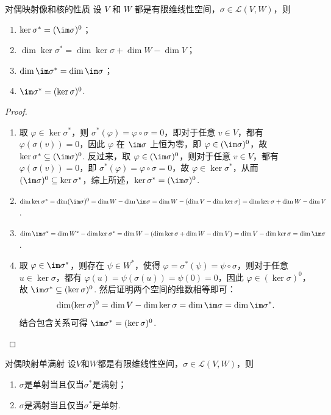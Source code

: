 \begin{theorem}{}{对偶映射像和核的性质}
    设 $V$ 和 $W$ 都是有限维线性空间，$\sigma\in\mathcal{L}(V,W)$，则
    \begin{enumerate}
        \item \label{item:6:对偶映射像和核的性质1} $\ker\sigma^*=(\im\sigma)^0$；
        \item $\dim\ker\sigma^*=\dim\ker\sigma+\dim W-\dim V$；
        \item $\dim\im\sigma^*=\dim\im\sigma$；
        \item \label{item:6:对偶映射像和核的性质4} $\im\sigma^*=(\ker\sigma)^0$.
    \end{enumerate}
\end{theorem}

\begin{proof}
    \begin{enumerate}
        \item 取 $\varphi \in \ker \sigma^*$，则 $\sigma^*(\varphi) = \varphi \circ \sigma = 0$，即对于任意 $v \in V$，都有 $\varphi(\sigma(v)) = 0$，因此 $\varphi$ 在 $\im \sigma$ 上恒为零，即 $\varphi \in (\im \sigma)^0$，故 $\ker \sigma^* \subseteq (\im \sigma)^0$. 反过来，取 $\varphi \in (\im \sigma)^0$，则对于任意 $v \in V$，都有 $\varphi(\sigma(v)) = 0$，即 $\sigma^*(\varphi) = \varphi \circ \sigma = 0$，故 $\varphi \in \ker \sigma^*$，从而 $(\im \sigma)^0 \subseteq \ker \sigma^*$，综上所述，$\ker \sigma^* = (\im \sigma)^0$.
        \item $\dim \ker \sigma^* = \dim (\im \sigma)^0 = \dim W - \dim \im \sigma = \dim W - (\dim V - \dim \ker \sigma) = \dim \ker \sigma + \dim W - \dim V$.
        \item $\dim \im \sigma^* = \dim W^* - \dim \ker \sigma^* = \dim W - (\dim \ker \sigma + \dim W - \dim V) = \dim V - \dim \ker \sigma = \dim \im \sigma$.
        \item 取 $\varphi \in \im \sigma^*$，则存在 $\psi \in W^*$，使得 $\varphi = \sigma^*(\psi) = \psi \circ \sigma$，则对于任意 $u \in \ker \sigma$，都有 $\varphi(u) = \psi(\sigma(u)) = \psi(0) = 0$，因此 $\varphi \in (\ker \sigma)^0$，故 $\im \sigma^* \subseteq (\ker \sigma)^0$. 然后证明两个空间的维数相等即可：
        \[\dim (\ker \sigma)^0 = \dim V - \dim \ker \sigma = \dim \im \sigma = \dim \im \sigma^*.\]
        结合包含关系可得 $\im \sigma^* = (\ker \sigma)^0$.
    \end{enumerate}
\end{proof}

\begin{corollary}{}{对偶映射单满射}
    设$V$和$W$都是有限维线性空间，$\sigma\in\mathcal{L}(V,W)$，则
    \begin{enumerate}
        \item $\sigma$是单射当且仅当$\sigma^*$是满射；
        \item $\sigma$是满射当且仅当$\sigma^*$是单射.
    \end{enumerate}
\end{corollary}

